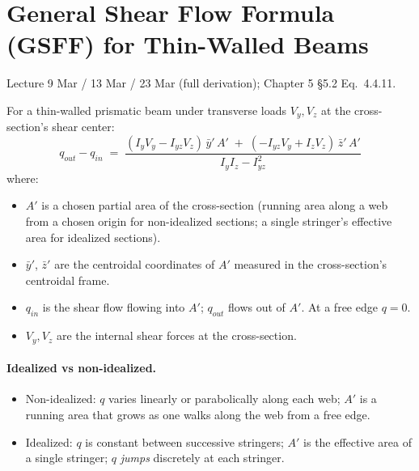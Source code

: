 \documentclass[11pt]{article}
\begin{document}
\section{General Shear Flow Formula (GSFF) for Thin-Walled Beams}

\begin{citebox}{Lecture 9 Mar / 13 Mar / 23 Mar (full derivation); Chapter 5 \S5.2 Eq.~4.4.11.}
\end{citebox}

For a thin-walled prismatic beam under transverse loads $V_y, V_z$ at the cross-section's shear center:
\begin{equation}
\boxed{\;q_{out} - q_{in} \;=\; \dfrac{(I_y V_y - I_{yz} V_z)\,\bar y'\,A' \;+\; (-I_{yz} V_y + I_z V_z)\,\bar z'\,A'}{I_y I_z - I_{yz}^2}\;}\label{eq:GSFF}
\end{equation}
where:
\begin{itemize}[leftmargin=2em, itemsep=1pt]
  \item $A'$ is a chosen partial area of the cross-section (running area along a web from a chosen origin for non-idealized sections; a single stringer's effective area for idealized sections).
  \item $\bar y'$, $\bar z'$ are the centroidal coordinates of $A'$ measured in the cross-section's centroidal frame.
  \item $q_{in}$ is the shear flow flowing into $A'$; $q_{out}$ flows out of $A'$. At a free edge $q = 0$.
  \item $V_y, V_z$ are the internal shear forces at the cross-section.
\end{itemize}

\paragraph{Idealized vs non-idealized.}
\begin{itemize}[leftmargin=2em, itemsep=1pt]
  \item Non-idealized: $q$ varies linearly or parabolically along each web; $A'$ is a running area that grows as one walks along the web from a free edge.
  \item Idealized: $q$ is constant between successive stringers; $A'$ is the effective area of a single stringer; $q$ \emph{jumps} discretely at each stringer.
\end{itemize}
\end{document}
